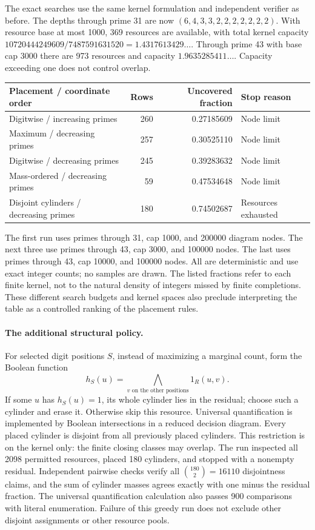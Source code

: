 \documentclass[11pt]{article}
\begin{document}
The exact searches use the same kernel formulation and independent
verifier as before. The depths through prime 31 are now
$(6,4,3,3,2,2,2,2,2,2,2)$. With resource base at most 1000, 369
resources are available, with total kernel capacity
$10720444249609/7487591631520=1.4317613429\ldots$.
Through prime 43 with base cap 3000 there are 973 resources and capacity
$1.9635285411\ldots$. Capacity exceeding one does not control overlap.

\begin{center}
\begin{tabular}{lrrl}
\toprule
Placement / coordinate order & Rows & Uncovered fraction & Stop reason\\
\midrule
Digitwise / increasing primes & 260 & 0.27185609 & Node limit\\
Maximum / decreasing primes & 257 & 0.30525110 & Node limit\\
Digitwise / decreasing primes & 245 & 0.39283632 & Node limit\\
Mass-ordered / decreasing primes & 59 & 0.47534648 & Node limit\\
Disjoint cylinders / decreasing primes & 180 & 0.74502687 & Resources exhausted\\
\bottomrule
\end{tabular}
\end{center}
The first run uses primes through 31, cap 1000, and 200000 diagram nodes.
The next three use primes through 43, cap 3000, and 100000 nodes.
The last uses primes through 43, cap 10000, and 100000 nodes.
All are deterministic and use exact integer counts; no samples are drawn.
The listed fractions refer to each finite kernel, not to the natural
density of integers missed by finite completions. These different search
budgets and kernel spaces also preclude interpreting the table as a
controlled ranking of the placement rules.

\paragraph{The additional structural policy.}
For selected digit positions $S$, instead of maximizing a marginal count,
form the Boolean function
\[
 h_S(u)=\bigwedge_{v\text{ on the other positions}}1_R(u,v).
\]
If some $u$ has $h_S(u)=1$, its whole cylinder lies in the residual;
choose such a cylinder and erase it. Otherwise skip this resource.
Universal quantification is implemented by Boolean intersections in a
reduced decision diagram. Every placed cylinder is disjoint from all
previously placed cylinders. This restriction is on the kernel only:
the finite closing classes may overlap.
The run inspected all 2098 permitted resources, placed 180 cylinders,
and stopped with a nonempty residual. Independent pairwise checks verify
all $\binom{180}{2}=16110$ disjointness claims, and the sum of cylinder
masses agrees exactly with one minus the residual fraction. The universal
quantification calculation also passes 900 comparisons with literal
enumeration. Failure of this greedy run does not exclude other disjoint
assignments or other resource pools.
\end{document}
